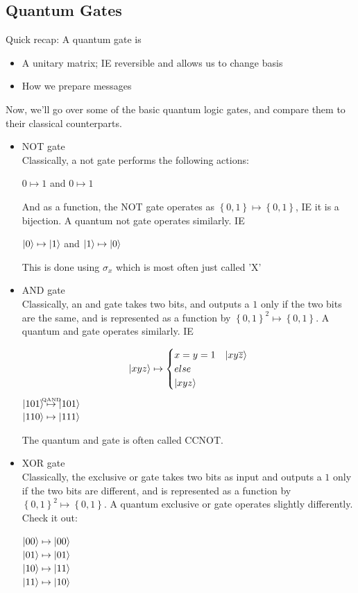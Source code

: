 \documentclass[12pt]{article}
\theoremstyle{plain}
\theoremstyle{nonumberplain}
\theoremstyle{plain}
\theoremstyle{nonumberplain}
\newcommand\1{{\bf 1}}
\newcommand{\<}{\left\langle}
\renewcommand{\>}{\right\rangle}
\newcommand{\lb}{\left\{}
\newcommand{\rb}{\right\}}
\begin{document}
\subsection{Quantum Gates}
Quick recap: A quantum gate is
\begin{itemize}
\item A unitary matrix; IE reversible and allows us to change basis
\item How we prepare messages
\end{itemize}
Now, we'll go over some of the basic quantum logic gates, and compare them to their classical counterparts.
\begin{itemize}
\item NOT gate\\
Classically, a not gate performs the following actions:
\begin{center}
$0\mapsto 1$ and $0\mapsto 1$
\end{center}
And as a function, the NOT gate operates as $\lb0,1\rb\mapsto\lb0,1\rb$, IE it is a bijection. A quantum not gate operates similarly. IE
\begin{center}
$\ket{0}\mapsto\ket{1}$ and $\ket{1}\mapsto\ket{0}$
\end{center}
This is done using $\sigma_x$ which is most often just called 'X'
\item AND gate\\
Classically, an and gate takes two bits, and outputs a $1$ only if the two bits are the same, and is represented as a function by $\lb0,1\rb^2\mapsto\lb0,1\rb$. A quantum and gate operates similarly. IE
\begin{center}
\[ \ket{xyz}\mapsto \begin{cases} 
      x=y=1 & \ket{xy\overline{z}}\\
      else \\
       \ket{xyz}
   \end{cases}
\]
$\ket{101}\stackrel{\makebox[0pt]{\mbox{\normalfont\tiny QAND}}}{\mapsto}\ket{101}$\\
$\ket{110}\mapsto\ket{111}$
\end{center}
The quantum and gate is often called CCNOT.
\item XOR gate\\
Classically, the exclusive or gate takes two bits as input and outputs a $1$ only if the two bits are different, and is represented as a function by $\lb0,1\rb^2\mapsto\lb0,1\rb$. A quantum exclusive or gate operates slightly differently. Check it out:
\begin{center}
$\ket{00}\mapsto\ket{00}$\\
$\ket{01}\mapsto\ket{01}$\\
$\ket{10}\mapsto\ket{11}$\\
$\ket{11}\mapsto\ket{10}$
\end{center}
\end{itemize}
\end{document}
